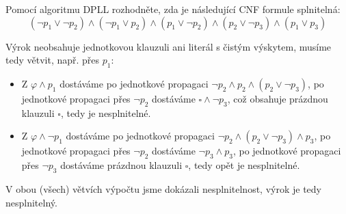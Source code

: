 \begin{problem} \label{problem:dpll}

    Pomocí algoritmu DPLL rozhodněte, zda je následující CNF formule splnitelná:
    $$ 
    (\neg p_1 \lor \neg p_2)\land( \neg p_1 \lor p_2)\land( p_1 \lor \neg p_2)\land( p_2 \lor \neg p_3)\land( p_1 \lor p_3)
    $$

    \begin{solution}
        Výrok neobsahuje jednotkovou klauzuli ani literál s čistým výskytem, musíme tedy větvit, např. přes $p_1$:
        \begin{itemize}
            \item Z $\varphi\land p_1$ dostáváme po jednotkové propagaci
            $\neg p_2\land p_2\land( p_2 \lor \neg p_3)$, po jednotkové propagaci přes $\neg p_2$ dostáváme $\square\land\neg p_3$, což obsahuje prázdnou klauzuli $\square$, tedy je nesplnitelné.
            \item Z $\varphi\land \neg p_1$ dostáváme po jednotkové propagaci
            $\neg p_2\land( p_2 \lor \neg p_3)\land p_3$, po jednotkové propagaci přes $\neg p_2$ dostáváme $\neg p_3\land p_3$, po jednotkové propagaci přes $\neg p_3$ dostáváme prázdnou klauzuli $\square$, tedy opět je nesplnitelné.            
        \end{itemize}
        V obou (všech) větvích výpočtu jsme dokázali nesplnitelnost, výrok je tedy nesplnitelný.                        
    \end{solution}

\end{problem}


